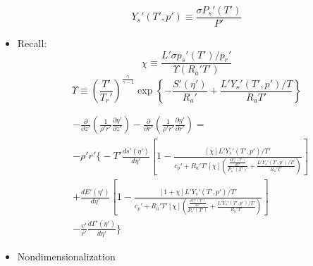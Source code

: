 \documentclass[preprint, prX]{revtex4}
\newcommand{\gogmo}{\frac{\gamma}{\gamma-1}}
\newcommand{\pfrac}[2]{\left(\frac{#1}{#2}\right)}
\newcommand{\dd}[2]{\frac{d#1}{d#2}}
\newcommand{\pd}[2]{\frac{\partial#1}{\partial#2}}
\begin{document}
\begin{itemize}
\begin{equation}
Y_s'(T',p') \equiv \frac{\sigma P_s'(T')}{P'}
\end{equation}

\item
Recall:
\begin{equation}
\chi \equiv \frac{L'\sigma p_s'(T')/p_r'}{\Upsilon(R_a' T')} 
\end{equation}
\begin{equation}
\Upsilon \equiv \pfrac{T'}{T_r'}^\gogmo \exp \left\{ -\frac{S'(\eta')}{R_a'} +\frac{L'Y_s'(T',p')/T}{R_a T'} \right\}
\end{equation}

\begin{equation}
\begin{split}
&-\pd{}{z'}\left( \frac{1}{\rho' r'} \pd{\eta'}{z'}\right) - \pd{}{r'}\left(\frac{1}{\rho'r'} \pd{\eta'}{r'}\right) =\\
&-\rho'r' \Bigg\{ -T' \dd{s'(\eta')}{\eta'} \left[ 1 - \frac{[\chi] L'Y_s'(T',p')/T'}{c_p' + R_a'T'[\chi] \left( \frac{\dd{P_s'(T')}{T'}}{P_s'(T')} +\frac{L'Y_s'(T',p')/T'}{R_a'T'} \right)}\right]  \\
& + \dd{E'(\eta')}{\eta'} \left[1 - \frac{[1+\chi] L'Y_s'(T',p')/T'}{c_p' + R_a'T'[\chi] \left( \frac{\dd{P_s'(T')}{T'}}{P_s'(T')} +\frac{L'Y_s'(T',p')/T'}{R_a'T'} \right)} \right]  \\
&- \frac{v'}{r'}\dd{\Gamma'(\eta')}{\eta'} \Bigg\}
\end{split}
\end{equation}

\item
Nondimensionalization 
\end{itemize}
\end{document}
